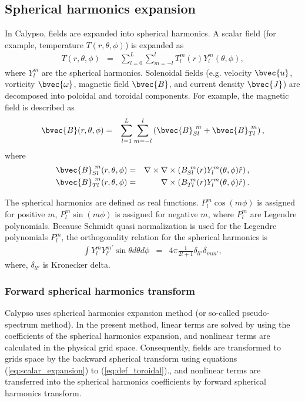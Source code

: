 \subsection{Spherical harmonics expansion}
In Calypso, fields are expanded into spherical harmonics. A scalar field (for example, temperature $T(r, \theta, \phi)$) is expanded as
%
\begin{eqnarray}
T(r, \theta, \phi) &=& \sum_{l=0}^{L} \sum_{m=-l}^{l} T_{l}^{m}(r) Y_{l}^{m}(\theta,\phi),
\label{eq:scalar_expansion}
\end{eqnarray}
where  $Y_{l}^{m}$ are the spherical harmonics. Solenoidal fields (e.g. velocity $\bvec{u}$, vorticity $\bvec{\omega}$, magnetic field $\bvec{B}$, and current density $\bvec{J}$) are decomposed into poloidal and toroidal components. For example, the magnetic field is described as 
\begin{eqnarray}
\bvec{B}(r, \theta, \phi) & = & \sum_{l=1}^{L} \sum_{m=-l}^{l} 
\left( \bvec{B}_{Sl}^{\ m} + \bvec{B}_{Tl}^{\ m} \right),
\label{eq:poloidal_toroidal}
\end{eqnarray}
where
\begin{eqnarray}
\bvec{B}_{Sl}^{\ m}(r, \theta, \phi) & = & \nabla \times \nabla \times \left( B_{Sl}^{\ m}(r) Y_{l}^{m}(\theta,\phi) \hat{r} \right),
\label{eq:def_poloidal} \\
\bvec{B}_{Tl}^{\ m}(r, \theta, \phi) & = & \nabla \times \left( B_{Tl}^{\ m}(r) Y_{l}^{m}(\theta,\phi) \hat{r} \right).
\label{eq:def_toroidal}
\end{eqnarray} 

The spherical harmonics are defined as real functions. $P_{l}^{m} \cos \left( m\phi \right)$ is assigned for positive $m$, $P_{l}^{m} \sin \left( m\phi \right)$ is assigned for negative $m$, where $P_{l}^{m}$ are Legendre polynomials. Because Schmidt quasi normalization is used for the Legendre polynomials $P_{l}^{m}$, the orthogonality relation for the spherical harmonics is 
%
\begin{eqnarray}
\int Y_{l}^{m} Y_{l'}^{m'} \sin \theta d\theta d\phi &=& 4\pi \frac{1}{2l+1} \delta_{ll'}\delta_{mm'},
\label{eq:sph_normalization}
\end{eqnarray}
%
where, $\delta_{ll'}$ is Kronecker delta.

\subsubsection{Forward spherical harmonics transform}
Calypso uses spherical harmonics expansion method (or so-called pseudo-spectrum method). In the present method, linear terms are solved by using the coefficients of the spherical harmonics expansion, and nonlinear terms are calculated in the physical grid space. Consequently, fields are transformed to grids space by the backward spherical transform using equations (\ref{eq:scalar_expansion}) to (\ref{eq:def_toroidal})., and nonlinear terms are transferred into the spherical harmonics coefficients by forward spherical harmonics transform.  


